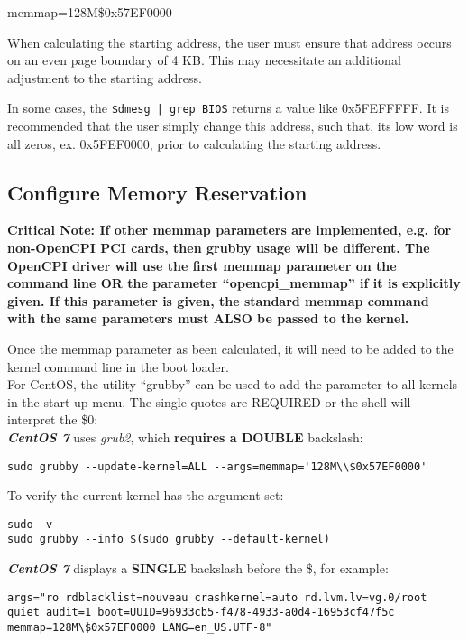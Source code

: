\begin{flushleft}
memmap=128M\$0x57EF0000 \\ \medskip

When calculating the starting address, the user must ensure that address occurs on an even page boundary of 4 KB. This may necessitate an additional adjustment to the starting address. \\ \medskip

In some cases, the \texttt{\$dmesg | grep BIOS} returns a value like 0x5FEFFFFF. It is recommended that the user simply change this address, such that, its low word is all zeros, ex. 0x5FEF0000, prior to calculating the starting address. \\ \medskip

\subsection{Configure Memory Reservation}
\textbf{Critical Note:
If other memmap parameters are implemented, e.g. for non-OpenCPI PCI cards, then grubby usage will be different. The OpenCPI driver will use the first memmap parameter on the command line OR the parameter ``opencpi\_memmap'' if it is explicitly given. If this parameter is given, the standard memmap command with the same parameters must ALSO be passed to the kernel.}\\ \bigskip

Once the memmap parameter as been calculated, it will need to be added to the kernel command line in the boot loader. \\
\bigskip
For CentOS, the utility ``grubby'' can be used to add the parameter to all kernels in the start-up menu. The single quotes are REQUIRED or the shell will interpret the \$0: \\
\bigskip
\textbf{\textit{CentOS 7}} uses \textit{grub2}, which \textbf{requires a DOUBLE} backslash:\\
\begin{lstlisting}
sudo grubby --update-kernel=ALL --args=memmap='128M\\$0x57EF0000'
\end{lstlisting}

To verify the current kernel has the argument set:\\
\begin{lstlisting}
sudo -v
sudo grubby --info $(sudo grubby --default-kernel)
\end{lstlisting}

\textbf{\textit{CentOS 7}} displays a \textbf{SINGLE} backslash before the \$, for example: \\
\begin{lstlisting}
args="ro rdblacklist=nouveau crashkernel=auto rd.lvm.lv=vg.0/root quiet audit=1 boot=UUID=96933cb5-f478-4933-a0d4-16953cf47f5c memmap=128M\$0x57EF0000 LANG=en_US.UTF-8"
\end{lstlisting}


\end{flushleft}
